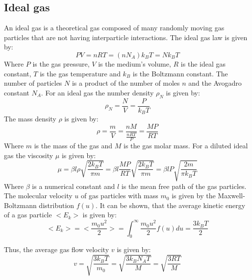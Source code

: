 \documentclass[\main/master.tex]{subfiles}
\begin{document}
\subsection{Ideal gas}
An ideal gas is a theoretical gas composed of many randomly moving gas particles that are not having interparticle interactions. The ideal gas law is given by:
\begin{equation}
PV = nRT = (n N_A) k_B T = N k_B T  \label{eqn:ideal-gasses}
\end{equation}
Where $P$ is the gas pressure, $V$ is the medium's volume, $R$ is the ideal gas constant, $T$ is the gas temperature and $k_B$ is the Boltzmann constant. The number of particles $N$ is a product of the number of moles $n$ and the Avogadro constant $N_A$. For an ideal gas the number density $\rho_N$ is given by:
\begin{equation}
\rho_N = \frac{N}{V}= \frac{P}{k_B T}    \label{eqn:ideal number density}
\end{equation}
The mass density $\rho$ is given by:
\begin{equation}
\rho = \frac{m}{V}=\frac{n M}{\frac{n R T}{P}}=\frac{MP}{RT}     \label{eqn:ideal density}
\end{equation}
Where $m$ is the mass of the gas and $M$ is the gas molar mass. For a diluted ideal gas the viscosity $\mu$ is given by:
\begin{equation}
\mu = \beta l \rho \sqrt{\frac{2 k_B  T}{\pi m}}  =  \beta l \frac{MP}{RT} \sqrt{\frac{2 k_B  T}{\pi m}} =  \beta l P \sqrt{\frac{2 m  }{\pi k_B T}}     \label{eqn:viscosity}
\end{equation}
Where $\beta$ is a numerical constant and $l$ is the mean free path of the gas particles. The molecular velocity $u$ of gas particles with mass $m_0$ is given by the Maxwell-Boltzmann distribution $f(u)$. It can be shown, that the average kinetic energy of a gas particle $<E_k>$ is given by:
\begin{equation}
<E_k>=<\frac{m_0u^2}{2}> = \int_{0}^{\infty}\frac{m_0 u^2}{2}f(u)du =  \frac{3k_BT}{2}    \label{eqn:average kinetic}
\end{equation}
\par\noindent
Thus, the average gas flow velocity $v$ is given by:
\begin{equation}
v =\sqrt{\frac{3k_B T}{m_0}}=\sqrt{\frac{3 k_B N_A T}{M}} =  \sqrt{\frac{3RT}{M}}   
\label{eqn:flow velocity}
\end{equation}
\end{document}
